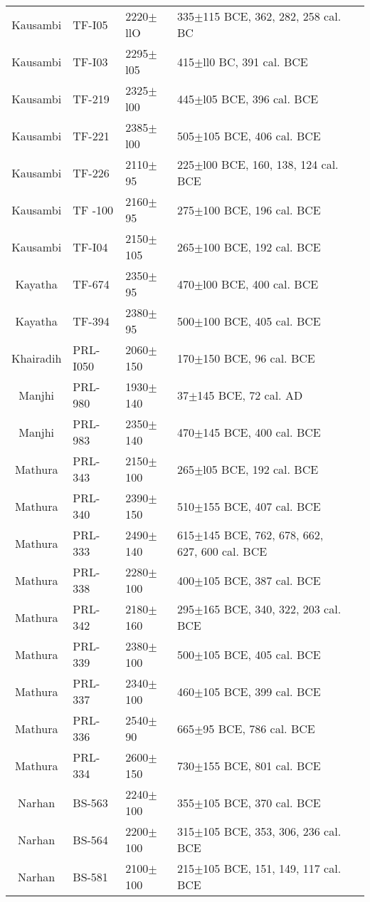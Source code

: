 {{\begin{longtable}{|c|p{1.1cm}|p{1.2cm}|p{1.8cm}|p{3.3cm}|}
Kausambi & TF-I05 & 2220$\pm$llO & 335$\pm$115 BCE, 362, 282, 258 cal. BC & \\
Kausambi & TF-I03 & 2295$\pm$l05 & 415$\pm$ll0 BC, 391 cal. BCE &\\
Kausambi & TF-219 & 2325$\pm$l00 & 445$\pm$l05 BCE, 396 cal. BCE &\\
Kausambi & TF-221 & 2385$\pm$l00 & 505$\pm$105 BCE, 406 cal. BCE &\\
Kausambi & TF-226 & 2110$\pm$95 & 225$\pm$l00 BCE, 160, 138, 124 cal. BCE &\\
Kausambi & TF -100 & 2160$\pm$95 & 275$\pm$100 BCE, 196 cal. BCE & \\
Kausambi & TF-I04 & 2150$\pm$105 & 265$\pm$100 BCE, 192 cal. BCE &\\
Kayatha & TF-674 & 2350$\pm$95 & 470$\pm$l00 BCE, 400 cal. BCE &\\
Kayatha & TF-394 & 2380$\pm$95 & 500$\pm$100 BCE, 405 cal. BCE & \\
Khairadih & PRL-I050 & 2060$\pm$150 & 170$\pm$150 BCE, 96 cal. BCE & \\
Manjhi & PRL-980 & 1930$\pm$140 & 37$\pm$145 BCE, 72 cal. AD &\\
Manjhi & PRL-983 & 2350$\pm$140 & 470$\pm$145 BCE, 400 cal. BCE & \\
Mathura & PRL-343 & 2150$\pm$100 & 265$\pm$l05 BCE, 192 cal. BCE &\\
Mathura & PRL-340 & 2390$\pm$150 & 510$\pm$155 BCE, 407 cal. BCE& \\
Mathura & PRL-333 & 2490$\pm$140 & 615$\pm$145 BCE, 762, 678, 662, 627, 600 cal. BCE &\\
Mathura & PRL-338 & 2280$\pm$100 & 400$\pm$105 BCE, 387 cal. BCE &\\
Mathura & PRL-342 & 2180$\pm$160 & 295$\pm$165 BCE, 340, 322, 203 cal. BCE & \\
Mathura & PRL-339 & 2380$\pm$100 & 500$\pm$105 BCE, 405 cal. BCE &\\
Mathura & PRL-337 & 2340$\pm$100 & 460$\pm$105 BCE, 399 cal. BCE &\\
Mathura & PRL-336 & 2540$\pm$90 & 665$\pm$95 BCE, 786 cal. BCE &\\
Mathura & PRL-334 & 2600$\pm$150 & 730$\pm$155 BCE, 801 cal. BCE & \\
Narhan & BS-563 & 2240$\pm$100 & 355$\pm$105 BCE, 370 cal. BCE & \\
Narhan & BS-564 & 2200$\pm$100 & 315$\pm$105 BCE, 353, 306, 236 cal. BCE & \\
Narhan & BS-581 & 2100$\pm$100 & 215$\pm$105 BCE, 151, 149, 117 cal. BCE & \\

\end{longtable}}}
